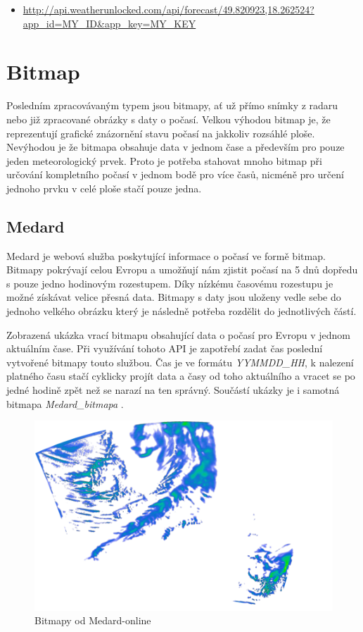 \documentclass[czech,bachelor,dept460,male,csharp,cpdeclaration]{diploma}
\begin{document}
	\begin{itemize}
		\item \url{http://api.weatherunlocked.com/api/forecast/49.820923,18.262524?app\_id=MY\_ID\&app\_key=MY\_KEY}
	\end{itemize}
	
	\section{Bitmap}
	
	Posledním zpracovávaným typem jsou bitmapy, ať už přímo snímky z radaru nebo již zpracované obrázky s daty o počasí. Velkou výhodou bitmap je, že reprezentují grafické znázornění stavu počasí na jakkoliv rozsáhlé ploše. Nevýhodou je že bitmapa obsahuje data v jednom čase a především pro pouze jeden meteorologický prvek. Proto je potřeba stahovat mnoho bitmap při určování kompletního počasí v jednom bodě pro více časů, nicméně pro určení jednoho prvku v celé ploše stačí pouze jedna.
	
	\subsection{Medard}
	
	Medard \cite{medard} je webová služba poskytující informace o počasí ve formě bitmap. Bitmapy pokrývají celou Evropu a umožňují nám zjistit počasí na 5 dnů dopředu s pouze jedno hodinovým rozestupem. Díky nízkému časovému rozestupu je možné získávat velice přesná data. Bitmapy s daty jsou uloženy vedle sebe do jednoho velkého obrázku který je následně potřeba rozdělit do jednotlivých částí.
	
	Zobrazená ukázka vrací bitmapu obsahující data o počasí pro Evropu v jednom aktuálním čase. Při využívání tohoto API je zapotřebí zadat čas poslední vytvořené bitmapy touto službou. Čas je ve formátu {\it YYMMDD\_HH}, k nalezení platného času stačí cyklicky projít data a časy od toho aktuálního a vracet se po jedné hodině zpět než se narazí na ten správný. Součástí ukázky je i samotná bitmapa \emph{Medard\_bitmapa} \cite{medard}.
	
	\begin{figure}[b!]
		\centering
		\includegraphics[scale=0.4]{Data/Mdrd_ukazka.png}
		\caption{Bitmapy od Medard-online \cite{medard}}
	\end{figure}
	
\end{document}
